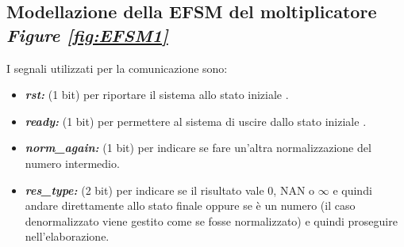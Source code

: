 \documentclass[]{IEEEtran}
\begin{document}
\subsection{Modellazione della EFSM del moltiplicatore {\it Figure \ref{fig:EFSM1}}}
I segnali utilizzati per la comunicazione sono:
\begin{itemize}
\item {\it\bf rst:} (1 bit) per riportare il sistema allo stato iniziale .
\item {\it\bf ready:} (1 bit) per permettere al sistema di uscire dallo stato iniziale .
\item {\it\bf norm\_again:} (1 bit) per indicare se fare un'altra normalizzazione del numero intermedio.
\item {\it\bf res\_type:} (2 bit) per indicare se il risultato vale 0, NAN o \(\infty\) e quindi andare direttamente allo stato finale oppure se è un numero (il caso denormalizzato viene gestito come se fosse normalizzato) e quindi proseguire nell'elaborazione.
\end{itemize}
\end{document}
